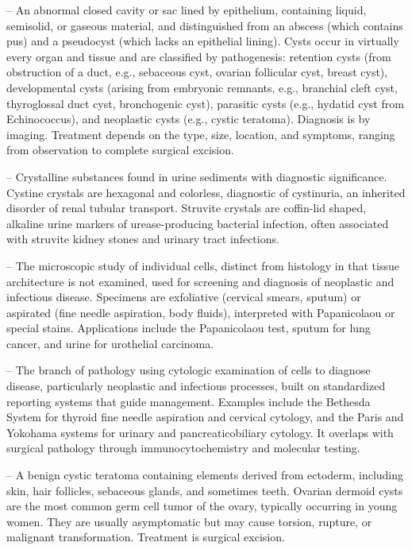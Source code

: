 -- An abnormal closed cavity or sac lined by epithelium, containing liquid, semisolid, or gaseous material, and distinguished from an abscess (which contains pus) and a pseudocyst (which lacks an epithelial lining). Cysts occur in virtually every organ and tissue and are classified by pathogenesis: retention cysts (from obstruction of a duct, e.g., sebaceous cyst, ovarian follicular cyst, breast cyst), developmental cysts (arising from embryonic remnants, e.g., branchial cleft cyst, thyroglossal duct cyst, bronchogenic cyst), parasitic cysts (e.g., hydatid cyst from Echinococcus), and neoplastic cysts (e.g., cystic teratoma). Diagnosis is by imaging. Treatment depends on the type, size, location, and symptoms, ranging from observation to complete surgical excision.

-- Crystalline substances found in urine sediments with diagnostic significance. Cystine crystals are hexagonal and colorless, diagnostic of cystinuria, an inherited disorder of renal tubular transport. Struvite crystals are coffin-lid shaped, alkaline urine markers of urease-producing bacterial infection, often associated with struvite kidney stones and urinary tract infections.

-- The microscopic study of individual cells, distinct from histology in that tissue architecture is not examined, used for screening and diagnosis of neoplastic and infectious disease. Specimens are exfoliative (cervical smears, sputum) or aspirated (fine needle aspiration, body fluids), interpreted with Papanicolaou or special stains. Applications include the Papanicolaou test, sputum for lung cancer, and urine for urothelial carcinoma.

-- The branch of pathology using cytologic examination of cells to diagnose disease, particularly neoplastic and infectious processes, built on standardized reporting systems that guide management. Examples include the Bethesda System for thyroid fine needle aspiration and cervical cytology, and the Paris and Yokohama systems for urinary and pancreaticobiliary cytology. It overlaps with surgical pathology through immunocytochemistry and molecular testing.

-- A benign cystic teratoma containing elements derived from ectoderm, including skin, hair follicles, sebaceous glands, and sometimes teeth. Ovarian dermoid cysts are the most common germ cell tumor of the ovary, typically occurring in young women. They are usually asymptomatic but may cause torsion, rupture, or malignant transformation. Treatment is surgical excision.

